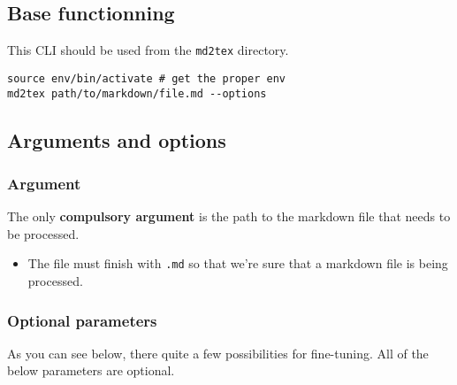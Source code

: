 \documentclass[a4paper, 12pt, twoside]{book}
\begin{document}
\subsection*{Base functionning}

This CLI should be used from the \texttt{md2tex} directory.

\begin{listing}[h!]
   \begin{verbatim}
source env/bin/activate # get the proper env
md2tex path/to/markdown/file.md --options

   \end{verbatim}
\end{listing}
\subsection*{Arguments and options}
\subsubsection*{Argument}

The only \textbf{compulsory argument} is the path to the markdown file that needs to be processed.

\begin{itemize}
\item The file must finish with \texttt{.md} so that we're sure that a markdown file is being processed. 
\end{itemize}
\subsubsection*{Optional parameters}

As you can see below, there quite a few possibilities for fine-tuning. All of the below
parameters are optional.
\end{document}
